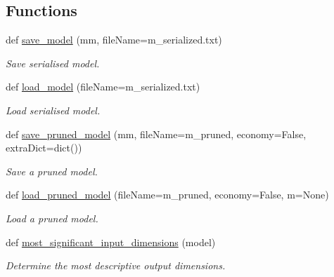 \subsection*{Functions}
\begin{DoxyCompactItemize}
\item 
def \hyperlink{group__icubclient__SAM__Core_ga9ce969892128bc69c859146c6ba19b47}{save\+\_\+model} (mm, file\+Name=\textquotesingle{}m\+\_\+serialized.\+txt\textquotesingle{})
\begin{DoxyCompactList}\small\item\em Save serialised model. \end{DoxyCompactList}\item 
def \hyperlink{group__icubclient__SAM__Core_gaccf785120f296a32b2b811e80b9bf455}{load\+\_\+model} (file\+Name=\textquotesingle{}m\+\_\+serialized.\+txt\textquotesingle{})
\begin{DoxyCompactList}\small\item\em Load serialised model. \end{DoxyCompactList}\item 
def \hyperlink{group__icubclient__SAM__Core_gae32d9cee31703fea1899ee5cc876e949}{save\+\_\+pruned\+\_\+model} (mm, file\+Name=\textquotesingle{}m\+\_\+pruned\textquotesingle{}, economy=False, extra\+Dict=dict())
\begin{DoxyCompactList}\small\item\em Save a pruned model. \end{DoxyCompactList}\item 
def \hyperlink{group__icubclient__SAM__Core_ga4ee9fba2f044889dbaff106b25dacd69}{load\+\_\+pruned\+\_\+model} (file\+Name=\textquotesingle{}m\+\_\+pruned\textquotesingle{}, economy=False, m=None)
\begin{DoxyCompactList}\small\item\em Load a pruned model. \end{DoxyCompactList}\item 
def \hyperlink{group__icubclient__SAM__Core_ga28b70c1cda2c0787dd3728b4e39a55a1}{most\+\_\+significant\+\_\+input\+\_\+dimensions} (model)
\begin{DoxyCompactList}\small\item\em Determine the most descriptive output dimensions. \end{DoxyCompactList}\end{DoxyCompactItemize}
